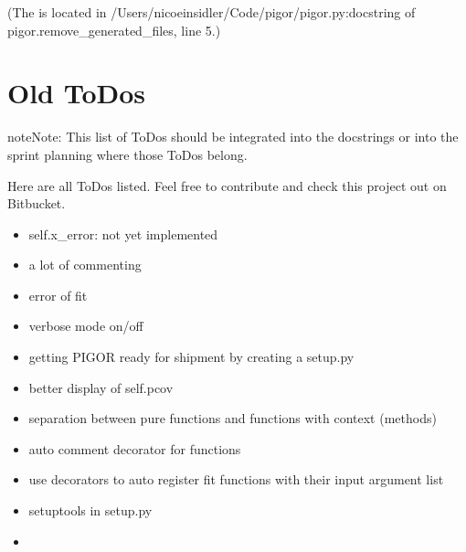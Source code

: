 \documentclass[letterpaper,10pt,english]{sphinxmanual}
\begin{document}
(The {\hyperref[\detokenize{pigor:index-3}]{}} is located in /Users/nicoeinsidler/Code/pigor/pigor.py:docstring of pigor.remove\_generated\_files, line 5.)


\chapter{Old ToDos}
\label{\detokenize{index:old-todos}}
\begin{sphinxadmonition}{note}{Note:}
This list of ToDos should be integrated into the docstrings or into the sprint planning where those ToDos belong.
\end{sphinxadmonition}

Here are all ToDos listed. Feel free to contribute and check this project out on Bitbucket.
\begin{itemize}
\item {} 
self.x\_error: not yet implemented

\item {} 
a lot of commenting

\item {} 
error of fit

\item {} 
verbose mode on/off

\item {} 
getting PIGOR ready for shipment by creating a setup.py

\item {} 
better display of self.pcov

\item {} 
separation between pure functions and functions with context (methods)

\item {} 
auto comment decorator for functions

\item {} 
use decorators to auto register fit functions with their input argument list

\item {} 
setuptools in setup.py

\item {} 

\end{itemize}
\end{document}

